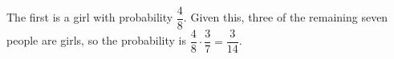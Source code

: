 The first is a girl with probability $\dfrac{4}{8}$. Given this, three of the remaining seven people are girls, so the probability is $\dfrac{4}{8}\cdot\dfrac{3}{7}=\boxed{\dfrac{3}{14}}$.
